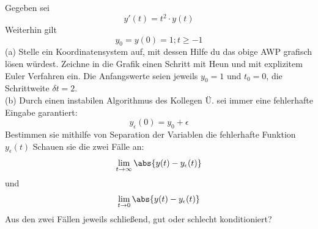 \documentclass{scrartcl}
\begin{document}
	Gegeben sei 
	$$y'(t) = t^2 \cdot y(t)$$
	Weiterhin gilt $$y_0 = y(0) = 1; t \ge -1$$
	(a)
	Stelle ein Koordinatensystem auf, mit dessen Hilfe du das obige AWP grafisch lösen würdest. Zeichne in die Grafik einen Schritt mit Heun und mit explizitem Euler Verfahren ein. Die Anfangswerte seien jeweils $y_0 = 1$ und $t_0 = 0$, die Schrittweite $\delta t = 2$.
	 \lbreak
	\\
	(b)
	Durch einen instabilen Algorithmus des Kollegen Ü. sei immer eine fehlerhafte Eingabe garantiert: $$y_\epsilon(0) = y_0 + \epsilon$$
	Bestimmen sie mithilfe von Separation der Variablen die fehlerhafte Funktion $y_\epsilon(t)$ \n
	Schauen sie die zwei Fälle an: $$\lim_{t \rightarrow \infty} \abs{y(t) - y_\epsilon(t)}$$ und $$\lim_{t \rightarrow 0} \abs{y(t) - y_\epsilon(t)}$$
	Aus den zwei Fällen jeweils schließend, gut oder schlecht konditioniert?
	

\end{document}
